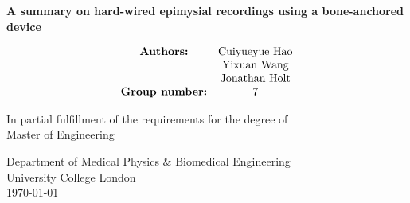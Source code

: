 \begin{titlepage}
    \begin{center}
        \vspace*{1cm}
            
        \huge
        \textbf{A summary on hard-wired epimysial recordings using a bone-anchored device}
            
        \vspace{0.5cm}
        \Large
        \vspace{1.5cm} \begin{align*}
            \begin{matrix}
                \text{\textbf{Authors:}} & \text{Cuiyueyue Hao} \\
                                         & \text{Yixuan Wang} \\
                                         & \text{Jonathan Holt} \\
                                         \text{\textbf{Group number:}} & \text{7} \\
            \end{matrix} \end{align*}

            
        \vfill
            
        In partial fulfillment of the requirements for the degree of \\
        Master of Engineering
            
        \vspace{0.8cm}
            
        \large
        Department of Medical Physics \& Biomedical Engineering\\
        University College London\\
        \today \\
            
    \end{center}
\end{titlepage}